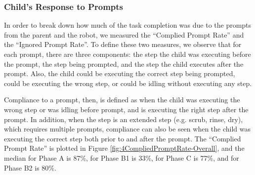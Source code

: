 \subsubsection{Child's Response to Prompts}
In order to break down how much of the task completion was due to the prompts from the parent and the robot, we measured the ``Complied Prompt Rate'' and the ``Ignored Prompt Rate''.  To define these two measures, we observe that for each prompt, there are three components: the step the child was executing before the prompt, the step being prompted, and the step the child executes after the prompt.  Also, the child could be executing the correct step being prompted, could be executing the wrong step, or could be idling without executing any step.

Compliance to a prompt, then, is defined as when the child was executing the wrong step or was idling before prompt, and is executing the right step after the prompt.  In addition, when the step is an extended step (e.g. scrub, rinse, dry), which requires multiple prompts, compliance can also be seen when the child was executing the correct step both prior to and after the prompt.  The ``Complied Prompt Rate'' is plotted in Figure \ref{fig:4CompliedPromptRate-Overall}, and the median for Phase A is 87\%, for Phase B1 is 33\%, for Phase C is 77\%, and for Phase B2 is 80\%.


